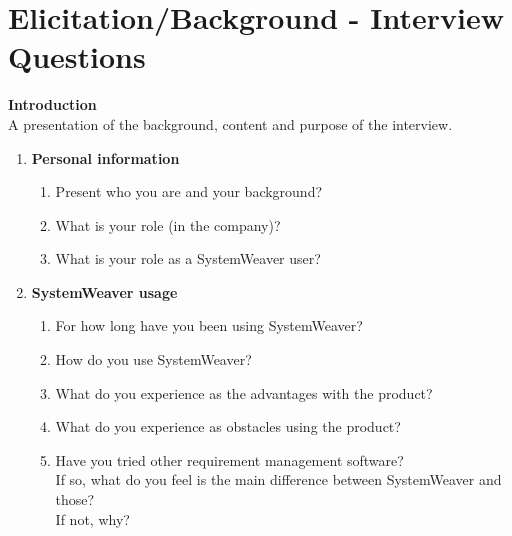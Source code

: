 \chapter{Elicitation/Background - Interview Questions}
\label{app:intquest}

\textbf{Introduction}\\
A presentation of the background, content and purpose of the interview.
\begin{enumerate}
\item \textbf{Personal information}
\begin{enumerate}
\item Present who you are and your background?
\item What is your role (in the company)?
\item What is your role as a SystemWeaver user?
\end{enumerate}

\item \textbf{SystemWeaver usage}
\begin{enumerate}
\item For how long have you been using SystemWeaver?
\item How do you use SystemWeaver?
\item What do you experience as the advantages with the product?
\item What do you experience as obstacles using the product?
\item Have you tried other requirement management software?\\
If so, what do you feel is the main difference between SystemWeaver and those?\\
If not, why?
\end{enumerate}


\end{enumerate}
